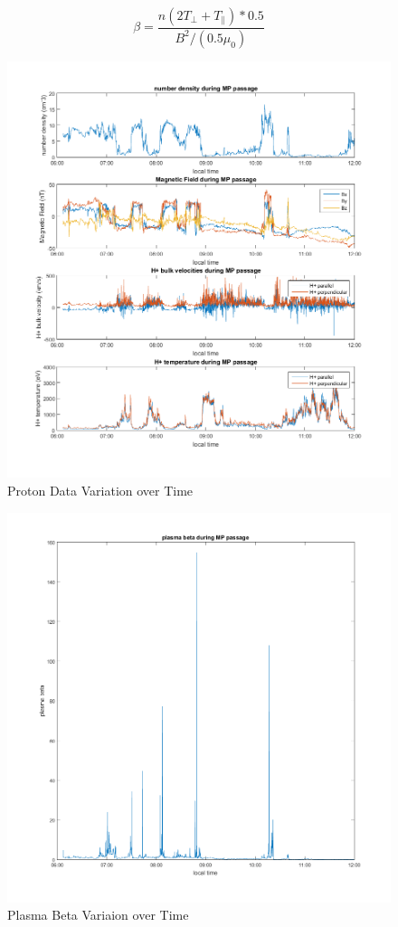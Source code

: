     \begin{equation}
    \beta = \frac{n (2T_{\bot} + T_{\parallel} ) * 0.5}{B^2 / (0.5 \mu_0)}
    \label{eq:beta}
    \end{equation}

    
    \begin{figure}[h!]
    	\centering
            \includegraphics[scale=0.6]{images/otherPlots.png}
            \caption{Proton Data Variation over Time}
            \label{fig:protdata}
	\end{figure}
	\begin{figure}[h!]
    		\centering
			\includegraphics[scale=0.6]{images/plasma_Beta.png}
            \caption{Plasma Beta Variaion over Time}
            \label{fig:magdata}
    \end{figure}
\clearpage
